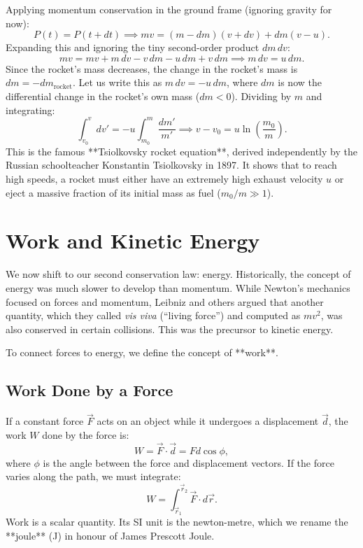 Applying momentum conservation in the ground frame (ignoring gravity for now):
\begin{equation}
    P(t) = P(t+dt) \implies m v = (m - dm)(v + dv) + dm(v - u).
\end{equation}
Expanding this and ignoring the tiny second-order product $dm\,dv$:
\begin{equation}
    m v = m v + m\,dv - v\,dm - u\,dm + v\,dm \implies m\,dv = u\,dm.
\end{equation}
Since the rocket's mass decreases, the change in the rocket's mass is $dm = -dm_{\text{rocket}}$. Let us write this as $m\,dv = -u\,dm$, where $dm$ is now the differential change in the rocket's own mass ($dm < 0$). Dividing by $m$ and integrating:
\begin{equation}
    \int_{v_0}^{v} dv' = -u \int_{m_0}^{m} \frac{dm'}{m'} \implies v - v_0 = u \ln\left(\frac{m_0}{m}\right).
\end{equation}
This is the famous **Tsiolkovsky rocket equation**, derived independently by the Russian schoolteacher Konstantin Tsiolkovsky in 1897. It shows that to reach high speeds, a rocket must either have an extremely high exhaust velocity $u$ or eject a massive fraction of its initial mass as fuel ($m_0/m \gg 1$).

\section{Work and Kinetic Energy}

We now shift to our second conservation law: energy. Historically, the concept of energy was much slower to develop than momentum. While Newton's mechanics focused on forces and momentum, Leibniz and others argued that another quantity, which they called \emph{vis viva} (``living force'') and computed as $mv^2$, was also conserved in certain collisions. This was the precursor to kinetic energy.

To connect forces to energy, we define the concept of **work**.

\subsection{Work Done by a Force}

If a constant force $\vec{F}$ acts on an object while it undergoes a displacement $\vec{d}$, the work $W$ done by the force is:
\begin{equation}
    W = \vec{F} \cdot \vec{d} = F d \cos\phi,
\end{equation}
where $\phi$ is the angle between the force and displacement vectors. If the force varies along the path, we must integrate:
\begin{equation}
    W = \int_{\vec{r}_1}^{\vec{r}_2} \vec{F} \cdot d\vec{r}.
\end{equation}
Work is a scalar quantity. Its SI unit is the newton-metre, which we rename the **joule** (\si{J}) in honour of James Prescott Joule.


